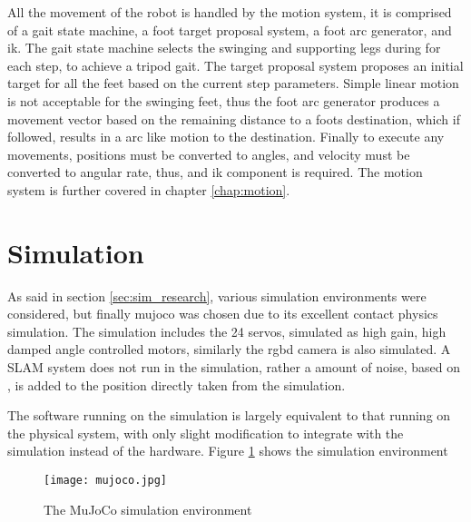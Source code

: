 All the movement of the robot is handled by the motion system, it is comprised of a gait state machine, a foot target proposal system, a foot arc generator, and \ac{ik}.
The gait state machine selects the swinging and supporting legs during for each step, to achieve a tripod gait. The target proposal system proposes an initial target for all the feet based
on the current step parameters. Simple linear motion is not acceptable for the swinging feet, thus the foot arc generator produces a movement vector based on the remaining distance to a foots destination,
which if followed, results in a arc like motion to the destination. Finally to execute any movements, positions must be converted to angles, and velocity must be converted to
angular rate, thus, and \ac{ik} component is required. The motion system is further covered in chapter \ref{chap:motion}.

\section{Simulation}
As said in section \ref{sec:sim_research}, various simulation environments were considered, but finally \ac{mujoco} was chosen due to its excellent contact physics
simulation. The simulation includes the 24 servos, simulated as high gain, high damped angle controlled motors, similarly the \ac{rgbd} camera is also simulated.
A SLAM system does not run in the simulation, rather a amount of noise, based on \cite{macario2022comprehensive}, is added to the position directly taken from the simulation.

The software running on the simulation is largely equivalent to that running on the physical system, with only slight modification to integrate with the simulation
instead of the hardware.
Figure \ref{fig:mujoco} shows the simulation environment
\begin{figure}[h]
    \centering
    \texttt{[image: mujoco.jpg]}
    \caption{The MuJoCo simulation environment}
    \label{fig:mujoco}
\end{figure}

